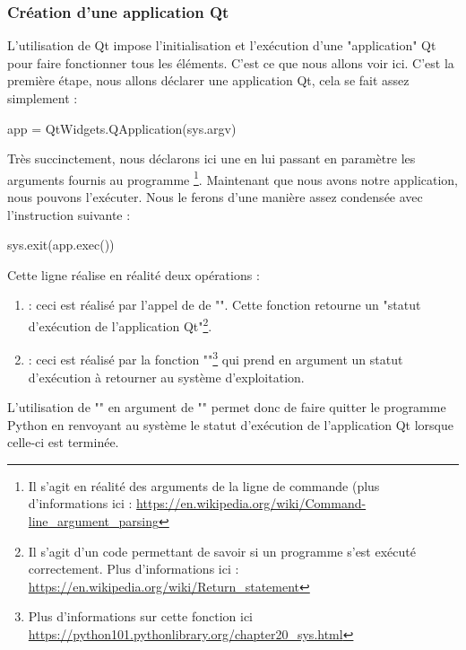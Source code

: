 {\subsubsection{Création d'une application Qt}

L'utilisation de Qt impose l'initialisation et l'exécution d'une "application" Qt pour faire fonctionner tous les éléments. C'est ce que nous allons voir ici.\newline
C'est la première étape, nous allons déclarer une application Qt, cela se fait assez simplement :
\begin{Python}
app = QtWidgets.QApplication(sys.argv)
\end{Python}
Très succinctement, nous déclarons ici une  en lui passant en paramètre les arguments fournis au programme
\footnote{Il s'agit en réalité des arguments de la ligne de commande (plus d'informations ici : \url{https://en.wikipedia.org/wiki/Command-line_argument_parsing}}.\newline
Maintenant que nous avons notre application, nous pouvons l'exécuter. Nous le ferons d'une manière assez condensée avec l'instruction suivante :
\begin{Python}
sys.exit(app.exec())
\end{Python}
Cette ligne réalise en réalité deux opérations :
\begin{enumerate}
    \item {} : ceci est réalisé par l'appel de de "". Cette fonction retourne un "statut d'exécution de l'application Qt"\footnote{Il s'agit d'un code permettant de savoir si un programme s'est exécuté correctement.\newline
    Plus d'informations ici : \url{https://en.wikipedia.org/wiki/Return_statement}}.
    
    \item {} : ceci est réalisé par la fonction ""\footnote{Plus d'informations sur cette fonction ici \url{https://python101.pythonlibrary.org/chapter20_sys.html}} qui prend en argument un statut d'exécution à retourner au système d'exploitation.
\end{enumerate}
L'utilisation de "" en argument de "" permet donc de faire quitter le programme Python en renvoyant au système le statut d'exécution de l'application Qt lorsque celle-ci est terminée.\\

}
